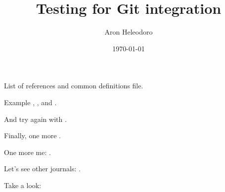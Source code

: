 \documentclass{article}
\title{Testing for Git integration}
\author{Aron Heleodoro}
\date{\today}
\begin{document}
\maketitle

List of references and common definitions file.

Example \cite{benjamin_hennion_higher_2017}, \cite{heleodoro_geometry_2018}, \cite{Raskin-D-modules} and \cite{HA}.

And try again with \cite{heleodoro_geometry_2018}.

Finally, one more \cite{elmanto2020nilpotent}.

One more me: \cite{heleodoro2020prestacks}.

Let's see other journals: \cite{AGH}.

Take a look: \cites{shirane2020double,shirane2020arXiv201009243S}

% 
% 

\printbibliography
\end{document}
